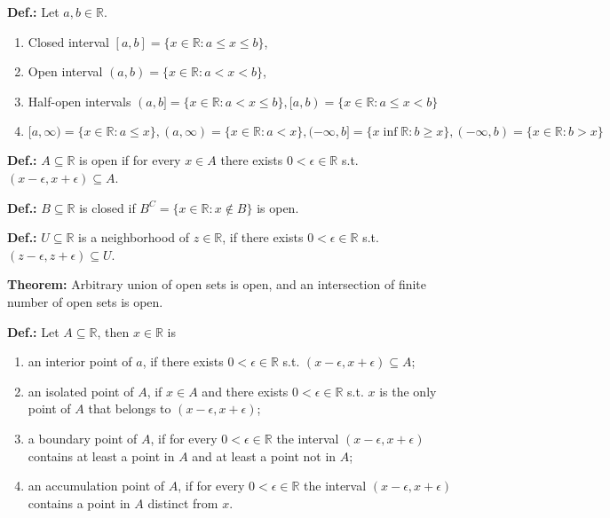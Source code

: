 \documentclass{article}
\begin{document}
\textbf{Def.:} Let $a, b \in \mathbb{R}$.
\begin{enumerate}
    \item Closed interval $[a, b]=\{x\in \mathbb{R}:a\leq x\leq b\}$,
    \item Open interval $(a, b)=\{x\in \mathbb{R}:a<x<b\}$,
    \item Half-open intervals $(a, b\text{]}=\{x\in \mathbb{R}:a<x\leq b\}, \text{[}a, b)=\{x\in \mathbb{R}:a\leq x < b\}$
    \item $\text{[}a, \infty)=\{x\in \mathbb{R}:a\leq x\}, (a, \infty)=\{x\in \mathbb{R}:a<x\}, (-\infty, b\text{]}=\{x\inf \mathbb{R}:b\geq x\}, (-\infty, b)=\{x\in \mathbb{R}:b>x\}$
\end{enumerate}

\textbf{Def.:} $A\subseteq \mathbb{R}$ is open if for every $x\in A$ there exists $0<\epsilon \in \mathbb{R}$ s.t. $(x-\epsilon, x+\epsilon)\subseteq A$.

\textbf{Def.:} $B\subseteq \mathbb{R}$ is closed if $B^C=\{x\in \mathbb{R}:x\notin B\}$ is open.

\textbf{Def.:} $U\subseteq \mathbb{R}$ is a neighborhood of $z\in \mathbb{R}$, if there exists $0<\epsilon \in \mathbb{R}$ s.t. $(z-\epsilon, z+\epsilon)\subseteq U$.

\textbf{Theorem:} Arbitrary union of open sets is open, and an intersection of finite number of open sets is open.

\textbf{Def.:} Let $A\subseteq \mathbb{R}$, then $x\in \mathbb{R}$ is
\begin{enumerate}
    \item an interior point of $a$, if there exists $0<\epsilon \in \mathbb{R}$ s.t. $(x-\epsilon, x+\epsilon)\subseteq A$;
    \item an isolated point of $A$, if $x\in A$ and there exists $0<\epsilon \in \mathbb{R}$ s.t. $x$ is the only point of $A$ that belongs to $(x-\epsilon, x+\epsilon)$; 
    \item a boundary point of $A$, if for every $0<\epsilon \in \mathbb{R}$ the interval $(x-\epsilon, x+\epsilon)$ contains at least a point in $A$ and at least a point not in $A$;
    \item an accumulation point of $A$, if for every $0<\epsilon \in \mathbb{R}$ the interval $(x-\epsilon, x+\epsilon)$ contains a point in $A$ distinct from $x$. 
\end{enumerate}
\end{document}

